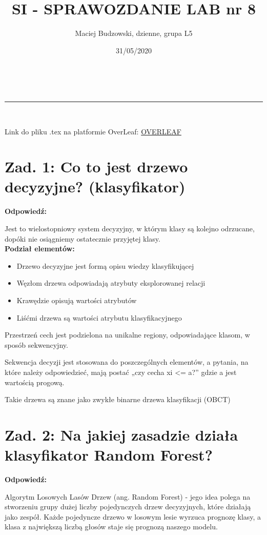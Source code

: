 \documentclass[a4paper,12pt]{article}
\makeatletter
\newcommand{\linia}{\rule{\linewidth}{0.5pt}}
\theoremstyle{mytheor}
\renewcommand{\maketitle}{
\begin{center}
\vspace{2ex}
{\huge \textsc{\@title}}
\vspace{1ex}
\\
\linia\\
\@author \hfill \@date
\vspace{4ex}
\end{center}
}
\makeatother
\begin{document}
\title{SI - SPRAWOZDANIE LAB nr 8}

\author{Maciej Budzowski, dzienne, grupa L5}

\date{31/05/2020}

\maketitle
Link do pliku .tex na platformie OverLeaf: \textcolor{red}{\href{https://www.overleaf.com/read/gtjhbdddtygc}{OVERLEAF}}

\section*{Zad. 1: Co to jest drzewo decyzyjne? (klasyfikator)}
\textbf{Odpowiedź:}

Jest to wielostopniowy system decyzyjny, w którym klasy są kolejno odrzucane, dopóki nie osiągniemy ostatecznie przyjętej klasy.\\

\textbf{Podział elementów:}
\begin{itemize}
  \item Drzewo decyzyjne jest formą opisu wiedzy klasyfikującej
  \item Węzłom drzewa odpowiadają atrybuty eksplorowanej relacji
  \item Krawędzie opisują wartości atrybutów
  \item Liśćmi drzewa są wartości atrybutu klasyfikacyjnego
\end{itemize}

Przestrzeń cech jest podzielona na unikalne regiony, odpowiadające klasom, w sposób sekwencyjny.

Sekwencja decyzji jest stosowana do poszczególnych elementów, a pytania, na które należy odpowiedzieć, mają postać „czy cecha xi <= a?” gdzie a jest wartością progową.

Takie drzewa są znane jako zwykłe binarne drzewa klasyfikacji (OBCT)

\section*{Zad. 2: Na jakiej zasadzie działa klasyfikator Random Forest?}
\textbf{Odpowiedź:}

Algorytm Losowych Lasów Drzew (ang. Random Forest) - jego idea polega na stworzeniu grupy dużej liczby pojedynczych drzew decyzyjnych, które działają jako zespół. Każde pojedyncze drzewo w losowym lesie wyrzuca prognozę klasy, a klasa z największą liczbą głosów staje się prognozą naszego modelu.
\end{document}
